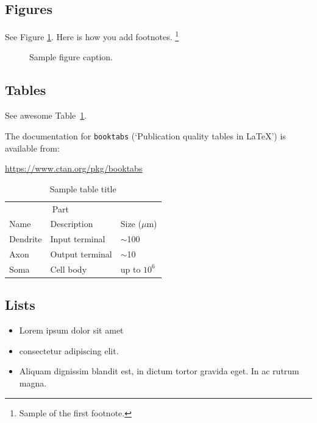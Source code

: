 \documentclass{article}
\begin{document}
\subsection{Figures}
\lipsum[10]
See Figure \ref{fig:fig1}. Here is how you add footnotes. \footnote{Sample of the first footnote.}
\lipsum[11]

\begin{figure}
	\centering
	\fbox{\rule[-.5cm]{4cm}{4cm} \rule[-.5cm]{4cm}{0cm}}
	\caption{Sample figure caption.}
	\label{fig:fig1}
\end{figure}

\subsection{Tables}
See awesome Table~\ref{tab:table}.

The documentation for \verb+booktabs+ (`Publication quality tables in LaTeX') is available from:
\begin{center}
	\url{https://www.ctan.org/pkg/booktabs}
\end{center}


\begin{table}
	\caption{Sample table title}
	\centering
	\begin{tabular}{lll}
		\toprule
		\multicolumn{2}{c}{Part}                   \\
		\cmidrule(r){1-2}
		Name     & Description     & Size ($\mu$m) \\
		\midrule
		Dendrite & Input terminal  & $\sim$100     \\
		Axon     & Output terminal & $\sim$10      \\
		Soma     & Cell body       & up to $10^6$  \\
		\bottomrule
	\end{tabular}
	\label{tab:table}
\end{table}

\subsection{Lists}
\begin{itemize}
	\item Lorem ipsum dolor sit amet
	\item consectetur adipiscing elit.
	\item Aliquam dignissim blandit est, in dictum tortor gravida eget. In ac rutrum magna.
\end{itemize}



\end{document}
